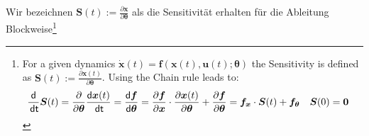 \documentclass[a4paper, 12pt]{scrartcl}
\newcommand{\dt}{\thinspace \mathsf{dt}}
\begin{document}
Wir bezeichnen $\bm{S}(t) := \frac{\partial \bm{x}}{\partial \bm{\theta}}$ 
als die Sensitivität erhalten für die Ableitung Blockweise\footnote{
    For a given dynamics $\bm{\dot{x}}(t) = \bm{f}(\bm{x}(t),\bm{u}(t); \bm{\theta})$ 
    the Sensitivity is defined as $\bm{S}(t):= \frac{\partial \bm{x}(t)}{\partial \bm{\theta}}$. 
    Using the Chain rule leads to:
    \begin{align*}
        \frac{\mathsf{d}}{\dt} \bm{S}(t)
        &= 
        \frac{\partial}{\partial \bm{\theta}}
        \frac{\mathsf{d} \bm{x}(t)}{\dt}
        =
        \frac{\mathsf{d}\bm{f}}{\mathsf{d}\bm{\theta}}
        =
        \frac{\partial \bm{f}}{\partial \bm{x}} 
        \cdot 
        \frac{\partial \bm{x}(t)}{\partial \bm{\theta}} 
        + 
        \frac{\partial \bm{f}}{\partial \bm{\theta}}
        =
        \bm{f}_{\bm{x}} \cdot \bm{S}(t) + \bm{f}_{\bm{\theta}}
        \quad
        \bm{S}(0) = \bm{0} 
    \end{align*}
}
\end{document}

